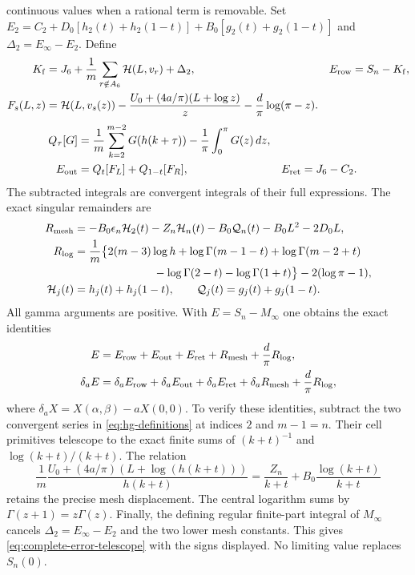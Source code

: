 continuous values when a rational term is removable. Set
$E_2=C_2+D_0[h_2(t)+h_2(1-t)]+B_0[g_2(t)+g_2(1-t)]$ and
$\Delta_2=E_\infty-E_2$. Define
\begin{align*}
 K_{\rm f}&=J_6+\frac1m\sum_{r\notin A_6}\mathcal H(L,v_r)+\Delta_2,
 &E_{\rm row}&=S_n-K_{\rm f},\\
 F_s(L,z)&=\mathcal H(L,v_s(z))
       -\frac{U_0+(4a/\pi)(L+\log z)}z-\frac d\pi\log(\pi-z).
\end{align*}
\begin{align*}
 Q_\tau[G]&=\frac1m\sum_{k=2}^{m-2}G(h(k+\tau))
                       -\frac1\pi\int_0^\pi G(z)\,dz,\\
 E_{\rm out}&=Q_t[F_L]+Q_{1-t}[F_R],&E_{\rm ret}&=J_6-C_2.
\end{align*}
The subtracted integrals are convergent integrals of their full
expressions. The exact singular remainders are
\begin{align}\label{eq:mesh-exact}
 R_{\rm mesh}&=-B_0\epsilon_n\mathcal H_2(t)-Z_n\mathcal H_n(t)
       -B_0\mathcal Q_n(t)-B_0L^2-2D_0L,\\
 R_{\log}&=\frac1m\bigl\{2(m-3)\log h+\log\Gamma(m-1-t)
       +\log\Gamma(m-2+t)\notag\\
 &\hspace{25mm}-\log\Gamma(2-t)-\log\Gamma(1+t)\bigr\}
           -2(\log\pi-1),\notag\\
 \mathcal H_j(t)&=h_j(t)+h_j(1-t),\qquad
 \mathcal Q_j(t)=g_j(t)+g_j(1-t).\notag
\end{align}
All gamma arguments are positive. With $E=S_n-M_\infty$ one obtains
the exact identities
\begin{align}\label{eq:complete-error-telescope}
 E&=E_{\rm row}+E_{\rm out}+E_{\rm ret}+R_{\rm mesh}
                    +\frac d\pi R_{\log},\\
 \delta_aE&=\delta_aE_{\rm row}+\delta_aE_{\rm out}
        +\delta_aE_{\rm ret}+\delta_aR_{\rm mesh}+\frac d\pi R_{\log},
\end{align}
where $\delta_aX=X(\alpha,\beta)-aX(0,0)$.
To verify these identities, subtract the two convergent series in
\eqref{eq:hg-definitions} at indices $2$ and $m-1=n$. Their cell
primitives telescope to the exact finite sums of $(k+t)^{-1}$ and
$\log(k+t)/(k+t)$. The relation
\[
 \frac1m\frac{U_0+(4a/\pi)(L+\log(h(k+t)))}{h(k+t)}
       =\frac{Z_n}{k+t}+B_0\frac{\log(k+t)}{k+t}
\]
retains the precise mesh displacement. The central logarithm sums by
$\Gamma(z+1)=z\Gamma(z)$. Finally, the defining regular finite-part
integral of $M_\infty$ cancels $\Delta_2=E_\infty-E_2$ and the two
lower mesh constants. This gives \eqref{eq:complete-error-telescope}
with the signs displayed. No limiting value replaces $S_n(0)$.

